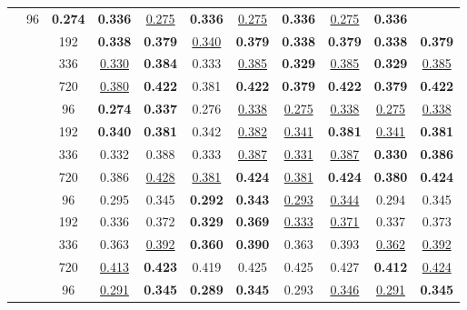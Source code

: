 \begin{table*}[!ht]
{\begin{tabular}{c|c|c|cc|cc|cc|cc}
		 & 96 &  \textbf{0.274} & \textbf{0.336} &  \underline{0.275} & \textbf{0.336} &  \underline{0.275} & \textbf{0.336} &  \underline{0.275} & \textbf{0.336} \\
		 & & 192 &  \textbf{0.338} & \textbf{0.379} &  \underline{0.340} & \textbf{0.379} &  \textbf{0.338} & \textbf{0.379} &  \textbf{0.338} & \textbf{0.379} \\
		 & & 336 &  \underline{0.330} & \textbf{0.384} &  0.333 & \underline{0.385} &  \textbf{0.329} & \underline{0.385} &  \textbf{0.329} & \underline{0.385} \\
		 & & 720 &  \underline{0.380} & \textbf{0.422} &  0.381 & \textbf{0.422} &  \textbf{0.379} & \textbf{0.422} &  \textbf{0.379} & \textbf{0.422} \\ \cmidrule{2-11}
	& \multirow{4}{*}{\rotatebox[origin=c]{90}{\text{512}}}
		 & 96 &  \textbf{0.274} & \textbf{0.337} &  0.276 & \underline{0.338} &  \underline{0.275} & \underline{0.338} &  \underline{0.275} & \underline{0.338} \\
		 & & 192 &  \textbf{0.340} & \textbf{0.381} &  0.342 & \underline{0.382} &  \underline{0.341} & \textbf{0.381} &  \underline{0.341} & \textbf{0.381} \\
		 & & 336 &  0.332 & 0.388 &  0.333 & \underline{0.387} &  \underline{0.331} & \underline{0.387} &  \textbf{0.330} & \textbf{0.386} \\
		 & & 720 &  0.386 & \underline{0.428} &  \underline{0.381} & \textbf{0.424} &  \underline{0.381} & \textbf{0.424} &  \textbf{0.380} & \textbf{0.424} \\
	\midrule
	\multirow{8}{*}{\rotatebox[origin=c]{90}{\text{ETTm1}}}
	& \multirow{4}{*}{\rotatebox[origin=c]{90}{\text{336}}}
		 & 96 &  0.295 & 0.345 &  \textbf{0.292} & \textbf{0.343} &  \underline{0.293} & \underline{0.344} &  0.294 & 0.345 \\
		 & & 192 &  0.336 & 0.372 &  \textbf{0.329} & \textbf{0.369} &  \underline{0.333} & \underline{0.371} &  0.337 & 0.373 \\
		 & & 336 &  0.363 & \underline{0.392} &  \textbf{0.360} & \textbf{0.390} &  0.363 & 0.393 &  \underline{0.362} & \underline{0.392} \\
		 & & 720 &  \underline{0.413} & \textbf{0.423} &  0.419 & 0.425 &  0.425 & 0.427 &  \textbf{0.412} & \underline{0.424} \\ \cmidrule{2-11}
	& \multirow{4}{*}{\rotatebox[origin=c]{90}{\text{512}}}
		 & 96 &  \underline{0.291} & \textbf{0.345} &  \textbf{0.289} & \textbf{0.345} &  0.293 & \underline{0.346} &  \underline{0.291} & \textbf{0.345} \\

\end{tabular}}
\end{table*}
